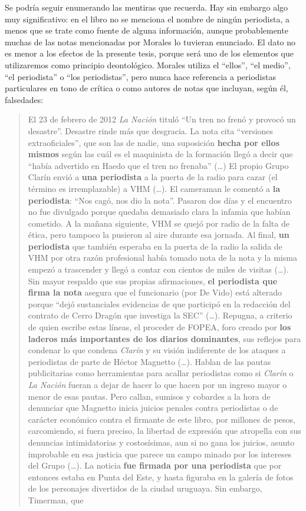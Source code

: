 Se podría seguir enumerando las mentiras que recuerda. Hay sin embargo algo muy significativo: en el libro no se menciona el nombre de ningún periodista, a menos que se trate como fuente de alguna información, aunque probablemente muchas de las notas mencionadas por Morales lo tuvieran enunciado. El dato no es menor a los efectos de la presente tesis, porque será uno de los elementos que utilizaremos como principio deontológico. Morales utiliza el \enquote{ellos}, \enquote{el medio}, \enquote{el periodista} o \enquote{los periodistas}, pero nunca hace referencia a periodistas particulares en tono de crítica o como autores de notas que incluyan, según él, falsedades:

\begin{quote}
El 23 de febrero de 2012 \emph{La Nación} tituló \enquote{Un tren no frenó y provocó un desastre}. Desastre rinde más que desgracia. La nota cita \enquote{versiones extraoficiales}, que son las de nadie, una suposición \textbf{hecha por ellos mismos} según las cuál es el maquinista de la formación llegó a decir que \enquote{había advertido en Haedo que el tren no frenaba} (\ldots) El propio Grupo Clarín envió a \textbf{una periodista} a la puerta de la radio para cazar (el término es irremplazable) a VHM (\ldots). El cameraman le comentó a \textbf{la periodista}: \enquote{Nos cagó, nos dio la nota}. Pasaron dos días y el encuentro no fue divulgado porque quedaba demasiado clara la infamia que habían cometido. A la mañana siguiente, VHM se quejó por radio de la falta de ética, pero tampoco la pusieron al aire durante esa jornada. Al final, \textbf{un periodista} que también esperaba en la puerta de la radio la salida de VHM por otra razón profesional había tomado nota de la nota y la misma empezó a trascender y llegó a contar con cientos de miles de visitas (\ldots). Sin mayor respaldo que sus propias afirmaciones, \textbf{el periodista que firma la nota} asegura que el funcionario (por De Vido) está alterado porque \enquote{dejó sustanciales evidencias de que participó en la redacción del contrato de Cerro Dragón que investiga la SEC} (\ldots). Repugna, a criterio de quien escribe estas líneas, el proceder de FOPEA, foro creado por \textbf{los laderos más importantes de los diarios dominantes}, sus reflejos para condenar lo que condena \emph{Clarín} y su visión indiferente de los ataques a periodistas de parte de Héctor Magnetto (\ldots). Hablan de las pautas publicitarias como herramientas para acallar periodistas como si \emph{Clarín} o \emph{La Nación} fueran a dejar de hacer lo que hacen por un ingreso mayor o menor de esas pautas. Pero callan, sumisos y cobardes a la hora de denunciar que Magnetto inicia juicios penales contra periodistas o de carácter económico contra el firmante de este libro, por millones de pesos, carcomiendo, si fuera preciso, la libertad de expresión que atropella con sus denuncias intimidatorias y costosísimas, aun si no gana los juicios, asunto improbable en esa justicia que parece un campo minado por los intereses del Grupo (\ldots). La noticia \textbf{fue firmada por una periodista} que por entonces estaba en Punta del Este, y hasta figuraba en la galería de fotos de los personajes divertidos de la ciudad uruguaya. Sin embargo, Timerman, que 
\end{quote}
